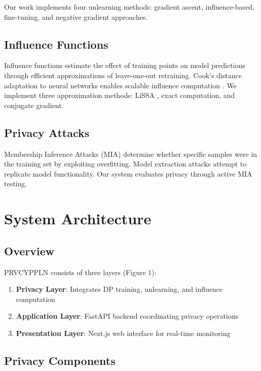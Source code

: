 \documentclass[conference]{IEEEtran}
\begin{document}
Our work implements four unlearning methods: gradient ascent, influence-based, fine-tuning, and negative gradient approaches.

\subsection{Influence Functions}

Influence functions \cite{koh2017understanding} estimate the effect of training points on model predictions through efficient approximations of leave-one-out retraining. Cook's distance adaptation to neural networks enables scalable influence computation \cite{koh2017understanding}. We implement three approximation methods: LiSSA \cite{agarwal2017second}, exact computation, and conjugate gradient.

\subsection{Privacy Attacks}

Membership Inference Attacks (MIA) \cite{shokri2017membership} determine whether specific samples were in the training set by exploiting overfitting. Model extraction attacks \cite{tramer2016stealing} attempt to replicate model functionality. Our system evaluates privacy through active MIA testing.

\section{System Architecture}

\subsection{Overview}

PRVCYPPLN consists of three layers (Figure 1):

\begin{enumerate}
    \item \textbf{Privacy Layer}: Integrates DP training, unlearning, and influence computation
    \item \textbf{Application Layer}: FastAPI backend coordinating privacy operations
    \item \textbf{Presentation Layer}: Next.js web interface for real-time monitoring
\end{enumerate}

\subsection{Privacy Components}
\end{document}
